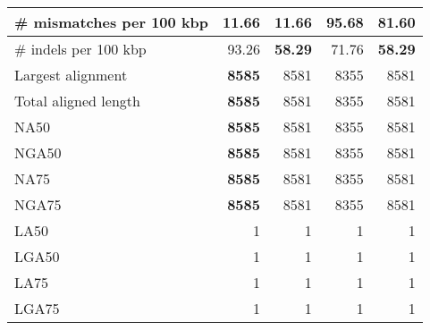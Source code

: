 \documentclass[12pt,a4paper]{article}
\begin{document}
\begin{table}[ht]
\begin{center}
\begin{tabular}{|l*{4}{|r}|}
\# mismatches per 100 kbp & {\bf 11.66} & {\bf 11.66} & 95.68 & 81.60 \\ \hline
\# indels per 100 kbp & 93.26 & {\bf 58.29} & 71.76 & {\bf 58.29} \\ \hline
Largest alignment & {\bf 8585} & 8581 & 8355 & 8581 \\ \hline
Total aligned length & {\bf 8585} & 8581 & 8355 & 8581 \\ \hline
NA50 & {\bf 8585} & 8581 & 8355 & 8581 \\ \hline
NGA50 & {\bf 8585} & 8581 & 8355 & 8581 \\ \hline
NA75 & {\bf 8585} & 8581 & 8355 & 8581 \\ \hline
NGA75 & {\bf 8585} & 8581 & 8355 & 8581 \\ \hline
LA50 & 1 & 1 & 1 & 1 \\ \hline
LGA50 & 1 & 1 & 1 & 1 \\ \hline
LA75 & 1 & 1 & 1 & 1 \\ \hline
LGA75 & 1 & 1 & 1 & 1 \\ \hline
\end{tabular}
\end{center}
\end{table}
\end{document}
